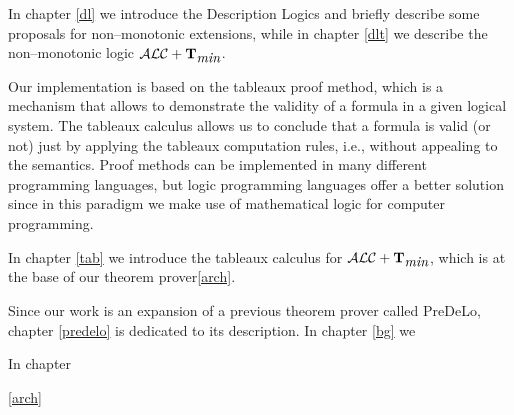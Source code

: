 \documentclass[a4paper, 11pt, oneside]{duthesis}
\newcommand{\tip}{{\bf T}}
\newcommand{\alctmin}{\mathcal{ALC}+\tip_{\mbox{\em min}}}
\begin{document}
%

In chapter \ref{dl} we introduce the Description Logics and briefly describe some proposals for non--monotonic extensions, while in chapter \ref{dlt} we describe the non--monotonic logic $\alctmin$.

Our implementation is based on the tableaux proof method, which is a mechanism that allows to demonstrate the validity of a formula in a given logical system.
The tableaux calculus allows us to conclude that a formula is valid (or not) just by applying the tableaux computation rules, i.e., without appealing to the semantics.
Proof methods can be implemented in many different programming languages, but logic programming languages offer a better solution since in this paradigm we make use of mathematical logic for computer programming.

In chapter \ref{tab} we introduce the tableaux calculus for $\alctmin$, which is at the base of our theorem prover\ref{arch}.

Since our work is an expansion of a previous theorem prover called PreDeLo, chapter \ref{predelo} is dedicated to its description. In chapter \ref{bg} we 

In chapter 


\ref{arch}\\



\newpage
\end{document}
